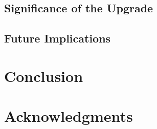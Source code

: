     \subsection{Significance of the Upgrade}
    \subsection{Future Implications}

\section{Conclusion}
\section{Acknowledgments}








